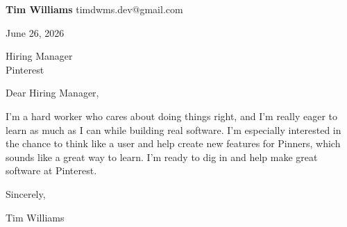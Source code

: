 \documentclass[12pt]{article}
\begin{document}
\textbf{Tim Williams} \hfill timdwms.dev@gmail.com

\vspace{1em}

June 26, 2026

\vspace{1em}

Hiring Manager \\
Pinterest

\vspace{1em}

Dear Hiring Manager,

I'm a hard worker who cares about doing things right, and I'm really eager to learn as much as I can while building real software. I'm especially interested in the chance to think like a user and help create new features for Pinners, which sounds like a great way to learn. I'm ready to dig in and help make great software at Pinterest.

\vspace{1em}

Sincerely,

\vspace{2em}

Tim Williams
\end{document}
